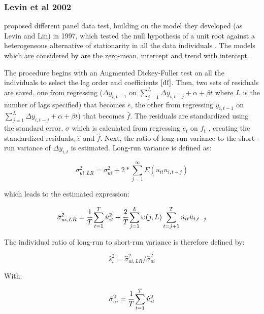 \subsubsection{Levin et al 2002}
\citet{llc} proposed different panel data test, building on the model they developed (as Levin and Lin) in 1997, which tested the null hypothesis of a unit root against a heterogeneous alternative of stationarity in all the data individuals \citep{llc}. The models which are considered by \citet{llc} are the zero-mean, intercept and trend with intercept.

The procedure begins with an Augmented Dickey-Fuller test on all the individuals to select the lag order and coefficients $\cite{df}$. Then, two sets of residuals are saved, one from regressing ($\Delta y_{i,t-1}$ on $\sum_{j=1}^{L} \Delta y_{i,t-j} + \alpha + \beta t$ where $L$ is the number of lags specified) that becomes $\bar{e}$, the other from regressing $y_{i,t-1}$ on $\sum_{j=1}^{L} \Delta y_{i,t-j} + \alpha + \beta t$) that becomes $\bar{f}$. The residuals are standardized using the standard error, $\sigma$ which is calculated from regressing $e_t$ on $f_t$ , creating the standardized residuals, $\hat{e}$ and $\hat{f}$. Next, the ratio of long-run variance to the short-run variance of $\Delta y_{i,t}$ is estimated. Long-run variance is defined as:

\begin{equation}
\sigma^2_{ui,LR} = \sigma^2_{ui} + 2 * \sum_{j=1}^{\infty}E(u_{it}u_{i,t-j})
\end{equation}

which leads to the estimated expression:

\begin{equation}
\hat{\sigma}^2_{ui,LR} = \cfrac{1}{T}\sum_{t=1}^{T}\hat{u}^2_{it} + \cfrac{2}{T} \sum_{j=1}^{L}\omega (j, L) \sum_{t=j+1}^{T} \hat{u}_{it}\hat{u}_{i,t-j}
\end{equation}

The individual ratio of long-run to short-run variance is therefore defined by:

\begin{equation}
\hat{s}^2_i = \hat{\sigma}^2_{ui,LR} / \hat{\sigma}^2_{ui}
\end{equation}

With:

\begin{equation}
\hat{\sigma}^2_{ui} = \cfrac{1}{T} \sum_{t=1}^{T} \hat{u}^2_{it}
\end{equation}

